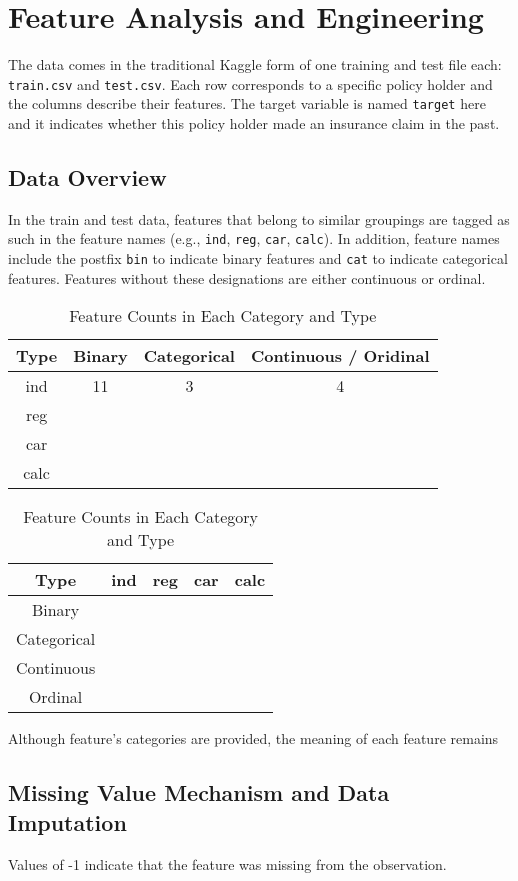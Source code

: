 \documentclass{standalone}
\begin{document}
\section{Feature Analysis and Engineering}

The data comes in the traditional Kaggle form of one training and test file
each: \lstinline{train.csv} and \lstinline{test.csv}. Each row corresponds to a
specific policy holder and the columns describe their features. The target
variable is named \lstinline{target} here and it indicates whether this policy
holder made an insurance claim in the past.

\subsection{Data Overview}

In the train and test data, features that belong to similar groupings are
tagged as such in the feature names (e.g., \lstinline{ind}, \lstinline{reg},
\lstinline{car}, \lstinline{calc}). In addition, feature names include the
postfix \lstinline{bin} to indicate binary features and \lstinline{cat} to
indicate categorical features. Features without these designations are either
continuous or ordinal.

\begin{table}[!h]
\renewcommand{\arraystretch}{1.3}
\caption{Feature Counts in Each Category and Type}\label{table_example}
\centering
\begin{tabular}{c|ccc}
\hline
\bfseries Type & \bfseries  Binary & \bfseries  Categorical & \bfseries  Continuous / Oridinal \\ \hline
\ttfamily ind & 11 & 3 & 4 \\ \hline
reg & & &  \\ \hline
car & & &  \\ \hline
calc & & &  \\ \hline
\end{tabular}

\begin{tabular}{c|cccc}
\hline
Type & \bfseries ind & \bfseries reg & car & calc \\ \hline
Binary & & & & \\ \hline
Categorical & & & & \\ \hline
Continuous & & & & \\ \hline
Ordinal & & & & \\ \hline
\end{tabular}
\end{table}

Although feature's categories are provided, the meaning of each feature remains 

\subsection{Missing Value Mechanism and Data Imputation}

Values of -1 indicate that the feature was missing from
the observation.
\end{document}
